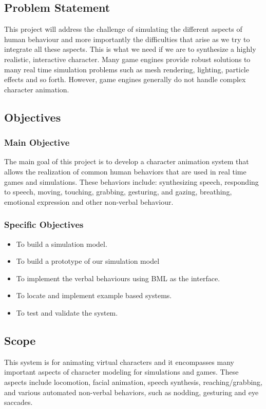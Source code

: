 \documentclass[options]{article}
\begin{document}
\subsection{\textbf{Problem Statement}}
This project will address the challenge of simulating the different aspects of human behaviour and more importantly the difficulties that arise as we try to integrate all these aspects. This is what we need if we are to synthesize a highly realistic, interactive character. \bigbreak
Many game engines provide robust solutions to many real time simulation problems such as mesh rendering, lighting, particle eﬀects and so forth. However, game engines generally do not handle complex character animation.


\subsection{\textbf{Objectives}}


\subsubsection{\textbf{Main Objective}} 
The main goal of this project is to develop a character animation system that allows the realization of common human behaviors that are used in real time games and simulations. 
These behaviors include: synthesizing speech, responding to speech, moving, touching, grabbing, gesturing, and gazing, breathing, emotional expression and other non-verbal behaviour.


\subsubsection{\textbf{Specific Objectives}}

\begin{itemize}
  \item To build a simulation model.
  \item To build a prototype of our simulation model
  \item To implement the verbal behaviours using BML as the interface.
  \item To locate and implement example based systems.
  \item To test and validate the system.
\end{itemize}


\subsection{\textbf{Scope}}
This system is for animating virtual characters and it encompasses many important aspects of character modeling for simulations and games. These aspects include locomotion, facial animation, speech synthesis, reaching/grabbing, and various automated non-verbal behaviors, such as nodding, gesturing and eye saccades.
\end{document}
